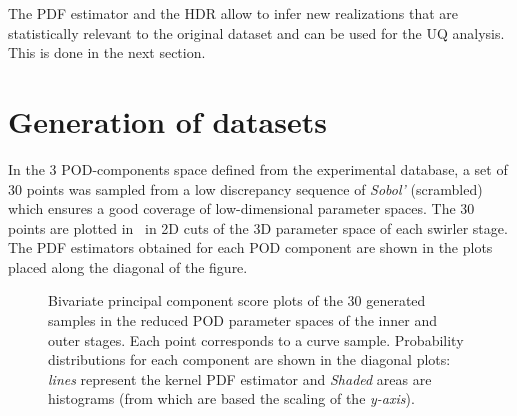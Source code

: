 The PDF estimator and the HDR allow to infer new realizations that are statistically relevant to the original dataset and can be used for the UQ analysis. This is done in the next section. 

\section{Generation of datasets }\label{sec:res}

In the 3 POD-components space defined from the experimental database, a set of 30 points was sampled from a low discrepancy sequence of \emph{Sobol'} (scrambled)~\cite{Cavazzuti2013,Kucherenko2015} which ensures a good coverage of low-dimensional parameter spaces. The 30 points are plotted in ~in 2D cuts of the 3D parameter space of each swirler stage. The PDF estimators obtained for each POD component are shown in the plots placed along the diagonal of the figure.  

\begin{figure}[!h]
\centering
{}
\caption{Bivariate principal component score plots of the 30 generated samples in the reduced POD parameter spaces of the inner and outer stages. Each point corresponds to a curve sample. Probability distributions for each component are shown in the diagonal plots: \emph{lines} represent the kernel PDF estimator and \emph{Shaded} areas are histograms (from which are based the scaling of the \emph{y-axis}).}
\label{fig:samples-scatter}
\end{figure}

